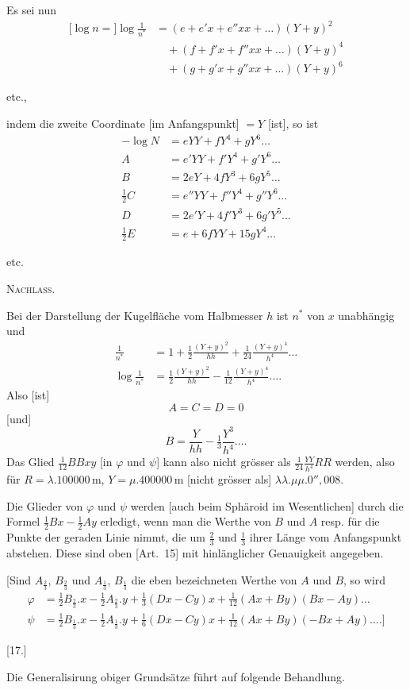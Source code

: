 Es sei nun
\[
\begin{aligned}
\mathopen{[}\log n=]\log\frac1{n^*}&=(e+e'x+e''xx+\ldots)(Y+y)^2\\
&\quad+(f+f'x+f''xx+\ldots)(Y+y)^4\\
&\quad+(g+g'x+g''xx+\ldots)(Y+y)^6
\end{aligned}
\]
\begin{center}etc.,\end{center}
indem die zweite Coordinate [im Anfangspunkt] $=Y$ [ist], so ist
\[
\begin{aligned}
-\log N&=eYY+fY^4+gY^6\ldots\\
A&=e'YY+f'Y^4+g'Y^6\ldots\\
B&=2eY+4fY^3+6gY^5\ldots\\
\tfrac12C&=e''YY+f''Y^4+g''Y^6\ldots\\
D&=2e'Y+4f'Y^3+6g'Y^5\ldots\\
\tfrac12E&=e+6fYY+15gY^4\ldots
\end{aligned}
\]
\begin{center}etc.\end{center}
\par\endgroup
\clearpage
{}\hfill\textsc{Nachlass.}\hfill\mbox{}\par\medskip
Bei der Darstellung der Kugelfläche vom Halbmesser $h$ ist $n^*$ von $x$ unabhängig und
\[
\begin{aligned}
\frac1{n^*}&=1+\tfrac12\frac{(Y+y)^2}{hh}+\tfrac1{24}\frac{(Y+y)^4}{h^4}\ldots\\
\log\frac1{n^*}&=\tfrac12\frac{(Y+y)^2}{hh}-\tfrac1{12}\frac{(Y+y)^4}{h^4}\ldots.
\end{aligned}
\]
Also [ist]
\[
A=C=D=0
\]
[und]
\[
B=\frac{Y}{hh}-\tfrac13\frac{Y^3}{h^4}\ldots.
\]
Das Glied $\tfrac1{12}BBxy$ [in $\varphi$ und $\psi$] kann also nicht grösser als $\tfrac1{24}\frac{YY}{h^4}RR$ werden, also für $R=\lambda.100000\,\mathrm m$, $Y=\mu.400000\,\mathrm m$ [nicht grösser als] $\lambda\lambda.\mu\mu.0''{,}008$.

Die Glieder von $\varphi$ und $\psi$ werden [auch beim Sphäroid im Wesentlichen] durch die Formel $\tfrac12Bx-\tfrac12Ay$ erledigt, wenn man die Werthe von $B$ und $A$ resp. für die Punkte der geraden Linie nimmt, die um $\frac23$ und $\frac13$ ihrer Länge vom Anfangspunkt abstehen. Diese sind oben [Art.~15] mit hinlänglicher Genauigkeit angegeben.

[Sind $A_{\frac23}$, $B_{\frac23}$ und $A_{\frac13}$, $B_{\frac13}$ die eben bezeichneten Werthe von $A$ und $B$, so wird
\[
\begin{aligned}
\varphi&=\tfrac12B_{\frac23}.x-\tfrac12A_{\frac23}.y+\tfrac13(Dx-Cy)x+\tfrac1{12}(Ax+By)(Bx-Ay)\ldots\\
\psi&=\tfrac12B_{\frac13}.x-\tfrac12A_{\frac13}.y+\tfrac16(Dx-Cy)x+\tfrac1{12}(Ax+By)(-Bx+Ay)\ldots.]
\end{aligned}
\]
\begin{center}[17.]\end{center}
Die Generalisirung obiger Grundsätze führt auf folgende Behandlung.

